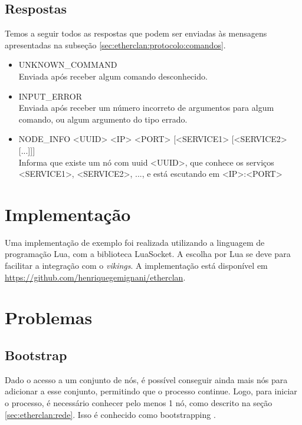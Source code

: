   \subsection{Respostas}
    Temos a seguir todos as respostas que podem ser enviadas às mensagens apresentadas na subseção
    \ref{sec:etherclan:protocolo:comandos}.
    
    \begin{itemize}
      \item UNKNOWN\_COMMAND \\
        Enviada após receber algum comando desconhecido.
        
      \item INPUT\_ERROR \\
        Enviada após receber um número incorreto de argumentos para algum comando, ou algum
        argumento do tipo errado.
    
      \item NODE\_INFO <UUID> <IP> <PORT> [<SERVICE1> [<SERVICE2> [...]]] \\
        Informa que existe um nó com uuid <UUID>, que conhece os serviços <SERVICE1>, <SERVICE2>, ...,
        e está escutando em <IP>:<PORT>
          
    \end{itemize}
  
\section{Implementação}
  Uma implementação de exemplo foi realizada utilizando a linguagem de programação Lua, com
  a biblioteca LuaSocket\footnotemark. A escolha por Lua se deve para facilitar a integração
  com o \textit{vikings}. A implementação está disponível em \url{https://github.com/henriquegemignani/etherclan}.
  

\section{Problemas}
  \subsection{Bootstrap}
    Dado o acesso a um conjunto de nós, é possível conseguir ainda mais nós para adicionar a esse
    conjunto, permitindo que o processo continue. Logo, para iniciar o processo, é necessário
    conhecer pelo menos 1 nó, como descrito na seção \ref{sec:etherclan:rede}. Isso é conhecido como
    bootstrapping \cite{tech:bootstrapping}.
    
